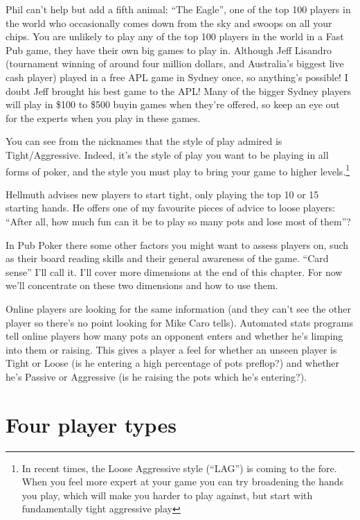Phil can't help but add a fifth animal: ``The Eagle'', one of the
top 100 players in the world who occasionally comes down from
the sky and swoops on all your chips. You are unlikely to play
any of the top 100 players in the world in a Fast Pub game, they
have their own big games to play in. Although Jeff Lisandro
(tournament winning of around four million dollars, and 
Australia's biggest live cash player) played in
a free APL game in Sydney once, so anything's possible! I doubt
Jeff brought his best game to the APL! Many
of the bigger Sydney players will play in \$100 to \$500 buyin
games when they're offered, so keep an eye out for the experts
when you play in these games.

You can see from the nicknames that the style
of play admired is Tight/Aggressive. Indeed,
it's the style of play you want to be playing in all forms of
poker, and the style you must play to bring your game to higher
levels.\footnote{In recent times, the Loose Aggressive style
(``LAG'') is coming to the fore. When you feel more expert
at your game you can try broadening the hands you play, which
will make you harder to play against, but start with fundamentally
tight aggressive play}

Hellmuth advises new players to start tight, only playing the
top 10 or 15 starting hands. He offers one of my favourite pieces
of advice to loose players: ``After all, how much fun can it be to
play so many pots and lose most of them''?

In Pub Poker there some other factors you might want to assess
players on, such as their board reading skills and their general
awareness of the game. ``Card sense'' I'll call it.  I'll cover more
dimensions at the end of this chapter. For now we'll concentrate on these 
two dimensions and how to use them.

Online players are looking for the same information (and they 
can't see the other player so there's no point looking for Mike Caro 
tells). Automated stats programs tell online players how many pots an
opponent enters and whether he's limping into them or raising. This 
gives a player a feel for whether an unseen player is Tight or Loose 
(is he entering a high percentage of pots preflop?) and whether he's
Passive or Aggressive (is he raising the pots which he's entering?).


\section{Four player types}

